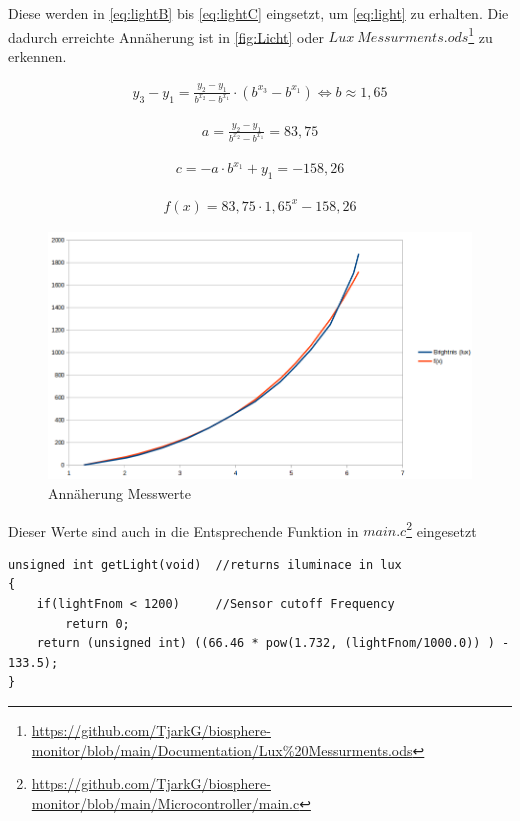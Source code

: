 \documentclass[12pt, a4paper, oneside]{report}
\begin{document}
Diese werden in \autoref{eq:lightB} bis \ref{eq:lightC} eingsetzt, um \autoref{eq:light} zu erhalten. Die dadurch erreichte Annäherung ist in \autoref{fig:Licht} oder $Lux~Messurments.ods$\footnote{\url{https://github.com/TjarkG/biosphere-monitor/blob/main/Documentation/Lux\%20Messurments.ods}} zu erkennen.

\begin{align}
y_3-y_1=\frac{y_2-y_1}{b^{x_2}-b^{x_1}}\cdot(b^{x_3}-b^{x_1}) \iff b \approx 1,65
\label{eq:lightB}
\end{align}

\begin{align}
a=\frac{y_2-y_1}{b^{x_2}-b^{x_1}} = 83,75
\label{eq:lightA}
\end{align}

\begin{align}
c = -a\cdot b^{x_1} + y_1 = -158,26
\label{eq:lightC}
\end{align}

\begin{align}
\label{eq:light}
f(x) = 83,75 \cdot 1,65^x -158,26
\end{align}

\begin{figure}[h]
	\centering
	\includegraphics[width=\textwidth]{pic/Aproximation}
	\caption{Annäherung Messwerte}
	\label{fig:Licht}
\end{figure}

Dieser Werte sind auch in die Entsprechende Funktion in $main.c$\footnote{\url{https://github.com/TjarkG/biosphere-monitor/blob/main/Microcontroller/main.c}} eingesetzt
\begin{lstlisting}
unsigned int getLight(void)  //returns iluminace in lux
{
	if(lightFnom < 1200)     //Sensor cutoff Frequency
		return 0;
	return (unsigned int) ((66.46 * pow(1.732, (lightFnom/1000.0)) ) - 133.5);
}
\end{lstlisting}
\end{document}
